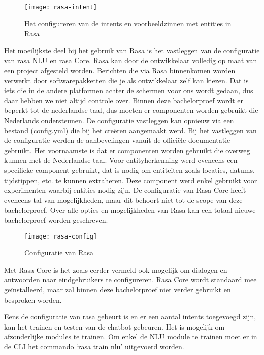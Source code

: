 \begin{figure}[H]
    \label{fig:rasa-intent}
    \centering
    \texttt{[image: rasa-intent]}
    \caption{Het configureren van de intents en voorbeeldzinnen met entities in Rasa}
\end{figure}

Het moeilijkste deel bij het gebruik van Rasa is het vastleggen van de configuratie van rasa NLU en rasa Core. Rasa kan door de ontwikkelaar volledig op maat van een project afgesteld worden. Berichten die via Rasa binnenkomen worden verwerkt door softwarepakketten die je als ontwikkelaar zelf kan kiezen. Dat is iets die in de andere platformen achter de schermen voor ons wordt gedaan, dus daar hebben we niet altijd controle over. Binnen deze bachelorproef wordt er beperkt tot de nederlandse taal, dus moeten er componenten worden gebruikt die Nederlands ondersteunen. De configuratie vastleggen kan opnieuw via een bestand (config.yml) die bij het creëren aangemaakt werd. Bij het vastleggen van de configuratie werden de aanbevelingen vanuit de officiële documentatie gebruikt. Het voornaamste is dat er componenten worden gebruikt die overweg kunnen met de Nederlandse taal. Voor entityherkenning werd eveneens een specifieke component gebruikt, dat is nodig om entiteiten zoals locaties, datums, tijdstippen, etc. te kunnen extraheren. Deze component werd enkel gebruikt voor experimenten waarbij entities nodig zijn.  De configuratie van Rasa Core heeft eveneens tal van mogelijkheden, maar dit behoort niet tot de scope van deze bachelorproef. Over alle opties en mogelijkheden van Rasa kan een totaal nieuwe bachelorproef worden geschreven. 

\begin{figure}[H]
    \label{fig:rasa-config}
    \centering
    \texttt{[image: rasa-config]}
    \caption{Configuratie van Rasa}
\end{figure}

Met Rasa Core is het zoals eerder vermeld ook mogelijk om dialogen en antwoorden naar eindgebruikers te configureren. Rasa Core wordt standaard mee geïnstalleerd, maar zal binnen deze bachelorproef niet verder gebruikt en besproken worden.

Eens de configuratie van rasa gebeurt is en er een aantal intents toegevoegd zijn, kan het trainen en testen van de chatbot gebeuren. Het is mogelijk om afzonderlijke modules te trainen. Om enkel de NLU module te trainen moet er in de CLI het commando ‘rasa train nlu’ uitgevoerd worden.

